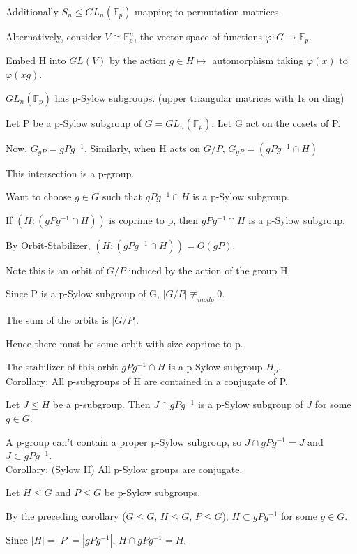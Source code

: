 \documentclass[12pt]{article}
\newcommand{\inv}{^{-1}}
\begin{document}
Additionally $S_n \leq GL_n(\mathds{F}_p)$ mapping to permutation matrices.

Alternatively, consider $V \cong \mathds{F}_p^n$, the vector space of functions $\varphi : G \to \mathds{F}_p$.

Embed H into $GL(V)$ by the action $g \in H \mapsto$ automorphism taking $\varphi(x)$ to $\varphi(xg)$.

$GL_n(\mathds{F}_p)$ has p-Sylow subgroups.  (upper triangular matrices with 1s on diag)

Let P be a p-Sylow subgroup of $G = GL_n(\mathds{F}_p)$.  Let G act on the cosets of P.

Now, $G_{gP} = gPg^{-1}$. Similarly, when H acts on $G \slash P$, $G_{gP} = (gPg^{-1} \cap H)$

This intersection is a p-group.

Want to choose $g \in G$ such that $gPg^{-1} \cap H$ is a p-Sylow subgroup.

If $(H : (gPg^{-1} \cap H))$ is coprime to p, then $gPg^{-1} \cap H$ is a p-Sylow subgroup.

By Orbit-Stabilizer, $(H : (gPg^{-1} \cap H)) = O(gP)$.

Note this is an orbit of $G/P$ induced by the action of the group H.

Since P is a p-Sylow subgroup of G, $|G\slash P| \not\equiv_{mod p} 0$.

The sum of the orbits is $|G \slash P|$.

Hence there must be some orbit with size coprime to p.

The stabilizer of this orbit $gPg\inv \cap H$ is a p-Sylow subgroup $H_p$.\\

\noindent
Corollary: All p-subgroups of H are contained in a conjugate of P.

Let $J \leq H$ be a p-subgroup.  Then $J \cap gPg\inv$ is a p-Sylow subgroup of $J$ for some $g \in G$.

A p-group can't contain a proper p-Sylow subgroup, so $J \cap gPg\inv = J$ and $J \subset gPg\inv$.\\

\noindent
Corollary: (Sylow II) All p-Sylow groups are conjugate.

Let $H \leq G$ and $P \leq G$ be p-Sylow subgroups.

By the preceding corollary ($G \leq G$, $H \leq G$, $P \leq G$), $H \subset gPg\inv$ for some $g \in G$.

Since $|H| = |P| = |gPg^{-1}|$, $H \cap gPg\inv = H$.\\
\end{document}
